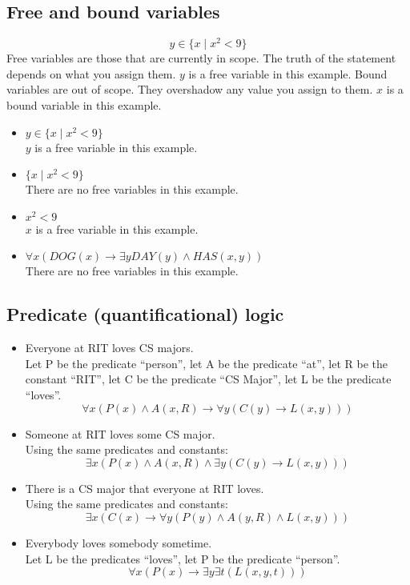 \documentclass[letterpaper, 12pt]{math}
\begin{document}
\subsection*{Free and bound variables}
\[ y\in\{x\mid x^2<9\} \]
Free variables are those that are currently in scope. The truth of the statement
depends on what you assign them. \( y \) is a free variable in this example.
Bound variables are out of scope. They overshadow any value you assign to them.
\( x \) is a bound variable in this example.
\begin{itemize}
  \item \( y\in\{x\mid x^2<9\} \) \\
    \( y \) is a free variable in this example.
  \item \( \{x\mid x^2<9\} \) \\
    There are no free variables in this example.
  \item \( x^2<9 \) \\
    \( x \) is a free variable in this example.
  \item \( \forall{x}(DOG(x)\to\exists{y}DAY(y)\wedge HAS(x,y)) \) \\
    There are no free variables in this example.
\end{itemize}

\subsection*{Predicate (quantificational) logic}
\begin{itemize}
  \item Everyone at RIT loves CS majors. \\
    Let P be the predicate ``person'', let A be the predicate ``at'', let
    R be the constant ``RIT'', let C be the predicate ``CS Major'', let L
    be the predicate ``loves''.
    \[ \forall{x}(P(x)\wedge A(x,R)\to\forall{y}(C(y)\to L(x,y))) \]
  \item Someone at RIT loves some CS major. \\
    Using the same predicates and constants:
    \[ \exists{x}(P(x)\wedge A(x,R)\wedge\exists{y}(C(y)\to L(x,y))) \]
  \item There is a CS major that everyone at RIT loves. \\
    Using the same predicates and constants:
    \[ \exists{x}(C(x)\to\forall{y}(P(y)\wedge A(y,R)\wedge L(x,y))) \]
  \item Everybody loves somebody sometime. \\
    Let L be the predicates ``loves'', let P be the predicate ``person''.
    \[ \forall{x}(P(x)\to\exists{y}\exists{t}(L(x,y,t))) \]
\end{itemize}
\end{document}
